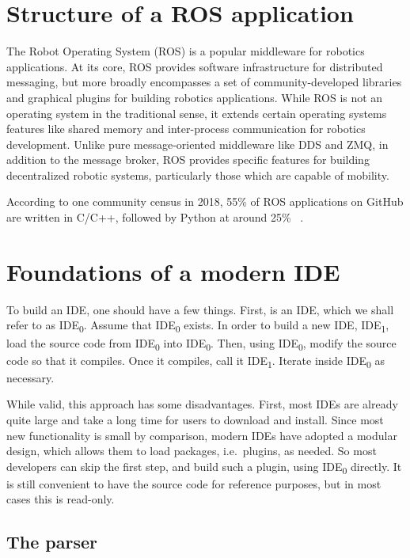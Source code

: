 \documentclass[12pt,initial,twoside,maitrise]{dms}
\numberwithin{equation}{section}
\numberwithin{table}{chapter}
\numberwithin{figure}{chapter}
\begin{document}
\section{Structure of a ROS application}

The Robot Operating System (ROS) is a popular middleware for robotics applications. At its core, ROS provides software infrastructure for distributed messaging, but more broadly encompasses a set of community-developed libraries and graphical plugins for building robotics applications. While ROS is not an operating system in the traditional sense, it extends certain operating systems features like shared memory and inter-process communication for robotics development. Unlike pure message-oriented middleware like DDS and ZMQ, in addition to the message broker, ROS provides specific features for building decentralized robotic systems, particularly those which are capable of mobility.

According to one community census in 2018, 55\% of ROS applications on GitHub are written in C/C++, followed by Python at around 25\% ~\cite{Areserio54:online}.

\section{Foundations of a modern IDE}

To build an IDE, one should have a few things. First, is an IDE, which we shall refer to as IDE\textsubscript{0}. Assume that IDE\textsubscript{0} exists. In order to build a new IDE, IDE\textsubscript{1}, load the source code from IDE\textsubscript{0} into IDE\textsubscript{0}. Then, using IDE\textsubscript{0}, modify the source code so that it compiles. Once it compiles, call it IDE\textsubscript{1}. Iterate inside IDE\textsubscript{0} as necessary.

While valid, this approach has some disadvantages. First, most IDEs are already quite large and take a long time for users to download and install. Since most new functionality is small by comparison, modern IDEs have adopted a modular design, which allows them to load packages, i.e.\ plugins, as needed. So most developers can skip the first step, and build such a plugin, using IDE\textsubscript{0} directly. It is still convenient to have the source code for reference purposes, but in most cases this is read-only.

\subsection{The parser}
\end{document}
